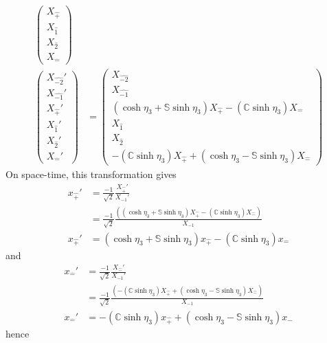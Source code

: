 \documentclass[foundations,article,submit,pdftex,moreauthors]{Definitions/mdpi}
\begin{document}
\begin{align}
\begin{pmatrix}
    {X}_{\hat{+}}\\
    {X}_{\hat{1}}\\
    {X}_{\hat{2}}\\
    {X}_{\hat{-}}
    \end{pmatrix}\\
    \begin{pmatrix}
    {X}_{\hat{-2}}'\\
    {X}_{\hat{-1}}'\\
    {X}_{\hat{+}}'\\
    {X}_{\hat{1}}'\\
    {X}_{\hat{2}}'\\
    {X}_{\hat{-}}'
    \end{pmatrix}&= \begin{pmatrix}
        {X}_{\hat{-2}}\\
        {X}_{\hat{-1}}\\
        (\cosh{\eta_{3}}+\mathbb{S}\sinh{\eta_{3}}){X}_{\hat{+}}-(\mathbb{C}\sinh{\eta_{3}}){X}_{\hat{-}}\\
    {X}_{\hat{1}}\\
    {X}_{\hat{2}}\\
        -(\mathbb{C}\sinh{\eta_{3}}){X}_{\hat{+}}+(\cosh{\eta_{3}}-\mathbb{S}\sinh{\eta_{3}}){X}_{\hat{-}}
    \end{pmatrix}
\end{align}
On space-time, this transformation gives
\begin{align}
    x_{\hat{+}}'&=\frac{-1}{\sqrt{2}}\frac{{X}_{{\hat{+}}}'}{ {X}_{-1}'}\\
    &=\frac{-1}{\sqrt{2}}\frac{((\cosh{\eta_{3}}+\mathbb{S}\sinh{\eta_{3}}){X}_{\hat{+}}-(\mathbb{C}\sinh{\eta_{3}}){X}_{\hat{-}})}{{X}_{-1}}\\
    x_{\hat{+}}'&=(\cosh{\eta_{3}}+\mathbb{S}\sinh{\eta_{3}}){x}_{\hat{+}}-(\mathbb{C}\sinh{\eta_{3}}){x}_{\hat{-}}
\end{align}
and
\begin{align}
    x_{\hat{-}}'&=\frac{-1}{\sqrt{2}}\frac{{X}_{{\hat{-}}}'}{ {X}_{-1}'}\\
    &=\frac{-1}{\sqrt{2}}\frac{(-(\mathbb{C}\sinh{\eta_{3}}){X}_{\hat{+}}+(\cosh{\eta_{3}}-\mathbb{S}\sinh{\eta_{3}}){X}_{\hat{-}})}{{X}_{-1}}\\
    x_{\hat{-}}'&=-(\mathbb{C}\sinh{\eta_{3}}){x}_{\hat{+}}+(\cosh{\eta_{3}}-\mathbb{S}\sinh{\eta_{3}}){x}_{\hat{-}}
\end{align}
hence
\end{document}

